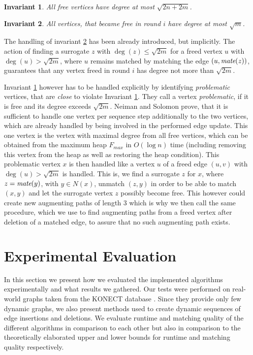 \documentclass{article}      %
\newtheorem{invariant}{Invariant}%
\DeclareMathOperator\mate{\emph{mate}}
\begin{document}
\begin{invariant} 
\label{inv:ns-1}
All free vertices have degree at most $\sqrt{2n + 2m}$.
\end{invariant}

\begin{invariant} 
\label{inv:ns-2}
All vertices, that became free in round $i$ have degree at most $\sqrt{m}$.
\end{invariant}

\noindent
The handling of invariant \ref{inv:ns-2} has been already introduced, but implicitly. The action of finding a surrogate $z$ with $\deg(z)\leq\sqrt{2m}$ for a freed vertex $u$ with $\deg(u)>\sqrt{2m}$, where $u$ remains matched by matching the edge $(u,\mate(z))$, guarantees that any vertex freed in round $i$ has degree not more than $\sqrt{2m}$.

Invariant \ref{inv:ns-1} however has to be handled explicitly by identifying \emph{problematic} vertices, that are \emph{close} to violate Invariant \ref{inv:ns-1}. They call a vertex \emph{problematic}, if it is free and its degree exceeds $\sqrt{2m}$. Neiman and Solomon prove, that it is sufficient to handle one vertex per sequence step additionally to the two vertices, which are already handled by being involved in the performed edge update. This one vertex is the vertex with maximal degree from all free vertices, which can be obtained from the maximum heap $F_{max}$ in $O(\log n)$ time (including removing this vertex from the heap as well as restoring the heap condition). This problematic vertex $x$ is then handled like a vertex $u$ of a freed edge $(u,v)$ with $\deg(u) > \sqrt{2m}$ is handled. This is, we find a surrogate $z$ for $x$, where $z=\mate(y)$, with $y \in N(x)$, unmatch $(z,y)$ in order to be able to match $(x,y)$ and let the surrogate vertex $z$ possibly become free. This however could create new augmenting paths of length $3$ which is why we then call the same procedure, which we use to find augmenting paths from a freed vertex after deletion of a matched edge, to assure that no such augmenting path exists.

\pagebreak
\section{Experimental Evaluation}
\label{sec:exp-eval}

In this section we present how we evaluated the implemented algorithms experimentally and what results we gathered. Our tests were performed on real-world graphs taken from the KONECT database \cite{konect}. Since they provide only few dynamic graphs, we also present methods used to create dynamic sequences of edge insertions and deletions. We evaluate runtime and matching quality of the different algorithms in comparison to each other but also in comparison to the theoretically elaborated upper and lower bounds for runtime and matching quality respectively.
\end{document}
